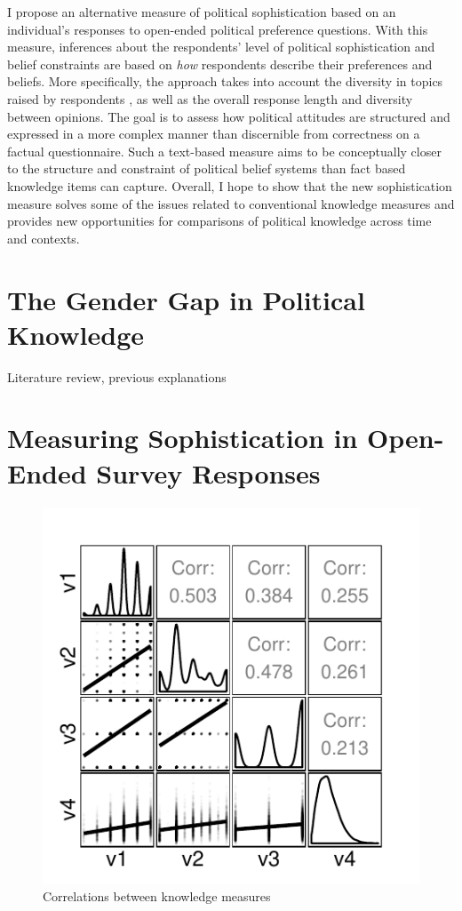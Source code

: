 \documentclass[12pt]{article}
\begin{document}
I propose an alternative measure of political sophistication based on an individual's responses to open-ended political preference questions. With this measure, inferences about the respondents' level of political sophistication and belief constraints are based on \textsl{how} respondents describe their preferences and beliefs. More specifically, the approach takes into account the diversity in topics raised by respondents \citep[measured using structural topic models][]{roberts2014structural}, as well as the overall response length and diversity between opinions. The goal is to assess how political attitudes are structured and expressed in a more complex manner than discernible from correctness on a factual questionnaire. Such a text-based measure aims to be conceptually closer to the structure and constraint of political belief systems 
\citep[see for example][]{tetlock1983cognitive,luskin1987measuring} than fact based knowledge items can capture. Overall, I hope to show that the new sophistication measure solves some of the issues related to conventional knowledge measures and provides new opportunities for comparisons of political knowledge across time and contexts.

\section*{The Gender Gap in Political Knowledge}

Literature review, previous explanations


\section*{Measuring Sophistication in Open-Ended Survey Responses}

\begin{figure}[h]\centering
\includegraphics{../fig/corplot.pdf}
\caption{Correlations between knowledge measures}\label{fig:corplot}
\end{figure}
\end{document}
